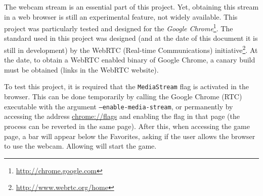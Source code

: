\label{sec:setup}

The webcam stream is an essential part of this project. Yet, obtaining this stream in a web browser is still an experimental feature, not widely available. This project was particularly tested and designed for the \textit{Google Chrome}\footnote{\url{http://chrome.google.com}}. The standard used in this project was designed (and at the date of this document it is still in development) by the WebRTC (Real-time Communications) initiative\footnote{\url{http://www.webrtc.org/home}}. At the date, to obtain a WebRTC enabled binary of Google Chrome, a canary build must be obtained (links in the WebRTC website).

To test this project, it is required that the \texttt{MediaStream} flag is activated in the browser. This can be done temporarily by calling the Google Chrome (RTC) executable with the argument \texttt{--enable-media-stream}, or permanently by accessing the address \url{chrome://flags} and enabling the flag in that page (the process can be reverted in the same page). After this, when accessing the game page, a bar will appear below the Favorites, asking if the user allows the browser to use the webcam. Allowing will start the game.
